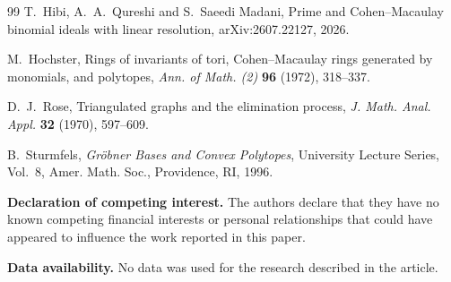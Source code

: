 \documentclass[12pt]{amsart}
\numberwithin{equation}{section}
\begin{document}
\begin{thebibliography}{99}
T.~Hibi, A.~A.~Qureshi and S.~Saeedi Madani,
Prime and Cohen--Macaulay binomial ideals with linear resolution,
arXiv:2607.22127, 2026.

M.~Hochster,
Rings of invariants of tori, Cohen--Macaulay rings generated by monomials, and polytopes,
\emph{Ann. of Math. (2)} \textbf{96} (1972), 318--337.

D.~J.~Rose,
Triangulated graphs and the elimination process,
\emph{J. Math. Anal. Appl.} \textbf{32} (1970), 597--609.

B.~Sturmfels,
\emph{Gr\"obner Bases and Convex Polytopes},
University Lecture Series, Vol.~8,
Amer. Math. Soc., Providence, RI, 1996.

\end{thebibliography}


\bigskip

\begin{footnotesize}
{\bf Declaration of competing interest.}  The authors declare that they have no known competing financial interests or personal relationships that could have appeared to influence the work reported in this paper.

\medskip

{\bf Data availability.} No data was used for the research described in the article. 

\medskip

\end{footnotesize}
\end{document}

